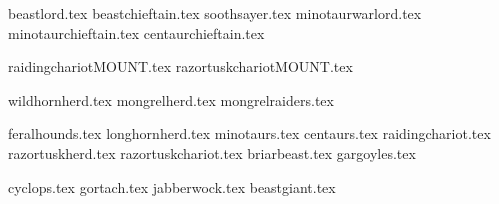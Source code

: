 
{beastlord.tex}
{beastchieftain.tex}
{soothsayer.tex}
{minotaurwarlord.tex}
{minotaurchieftain.tex}
{centaurchieftain.tex}

\clearpage
{}
{raidingchariotMOUNT.tex}
{razortuskchariotMOUNT.tex}

\clearpage
{}
{wildhornherd.tex}
{mongrelherd.tex}
{mongrelraiders.tex}

\clearpage
{}
{feralhounds.tex}
{longhornherd.tex}
{minotaurs.tex}
{centaurs.tex}
{raidingchariot.tex}
{razortuskherd.tex}
{razortuskchariot.tex}
{briarbeast.tex}
{gargoyles.tex}

\clearpage
{}
{cyclops.tex}
{gortach.tex}
{jabberwock.tex}
{beastgiant.tex}
